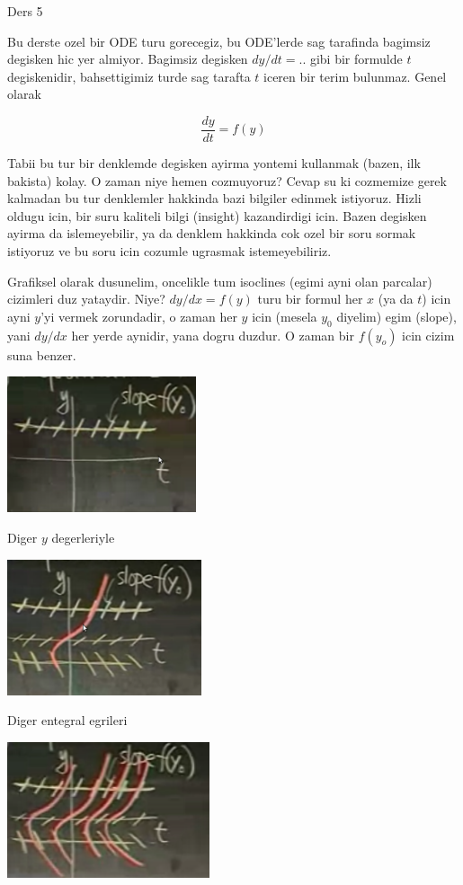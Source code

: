 \documentclass[12pt,fleqn]{article}\usepackage{../common}
\begin{document}
Ders 5

Bu derste ozel bir ODE turu gorecegiz, bu ODE'lerde sag tarafinda bagimsiz
degisken hic yer almiyor. Bagimsiz degisken $dy/dt = ..$ gibi bir formulde
$t$ degiskenidir, bahsettigimiz turde sag tarafta $t$ iceren bir terim
bulunmaz. Genel olarak

\[ \frac{dy}{dt} = f(y) \]

Tabii bu tur bir denklemde degisken ayirma yontemi kullanmak (bazen, ilk
bakista) kolay. O zaman niye hemen cozmuyoruz? Cevap su ki cozmemize gerek
kalmadan bu tur denklemler hakkinda bazi bilgiler edinmek istiyoruz. Hizli
oldugu icin, bir suru kaliteli bilgi (insight) kazandirdigi icin. Bazen
degisken ayirma da islemeyebilir, ya da denklem hakkinda cok ozel bir soru
sormak istiyoruz ve bu soru icin cozumle ugrasmak istemeyebiliriz.

Grafiksel olarak dusunelim, oncelikle tum isoclines (egimi ayni olan
parcalar) cizimleri duz yataydir. Niye? $dy/dx = f(y)$ turu bir formul her
$x$ (ya da $t$) icin ayni $y$'yi vermek zorundadir, o zaman her $y$ icin (mesela $y_0$
diyelim) egim (slope), yani $dy/dx$ her yerde aynidir, yana dogru duzdur. O
zaman bir $f(y_o)$ icin cizim suna benzer.

\includegraphics[height=4cm]{5_1.png}

Diger $y$ degerleriyle

\includegraphics[height=4cm]{5_2.png}

Diger entegral egrileri

\includegraphics[height=4cm]{5_3.png}
\end{document}
